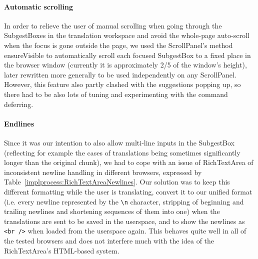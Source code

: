 \paragraph{Automatic scrolling}
In order to relieve the user of manual scrolling when going through the SubgestBoxes in the translation workspace and avoid the whole-page auto-scroll when the focus is gone outside the page, we used the ScrollPanel's method ensureVisible to automatically scroll each focused SubgestBox to a fixed place in the browser window (currently it is approximately 2/5 of the window's height), later rewritten more generally to be used independently on any ScrollPanel. However, this feature also partly clashed with the suggestions popping up, so there had to be also lots of tuning and experimenting with the command deferring.

\paragraph{Endlines}
Since it was our intention to also allow multi-line inputs in the SubgestBox (reflecting for example the cases of translations being sometimes significantly longer than the original chunk), we had to cope with an issue of RichTextArea of inconsistent newline handling in different browsers, expressed by Table~\ref{implprocess:RichTextAreaNewlines}. Our solution was to keep this different formatting while the user is translating, convert it to our unified format (i.e. every newline represented by the \verb=\n= character, stripping of beginning and trailing newlines and shortening sequences of them into one) when the translations are sent to be saved in the userspace, and to show the newlines as \verb=<br />= when loaded from the userspace again. This behaves quite well in all of the tested browsers and does not interfere much with the idea of the RichTextArea's HTML-based system.


